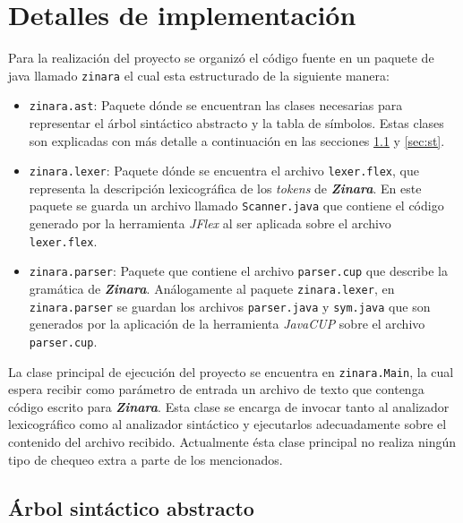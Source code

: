 \documentclass[12pt, spanish]{report}
\begin{document}
\section{Detalles de implementación}
\label{sec:codigo}

Para la realización del proyecto se organizó el código fuente en un
paquete de java llamado \texttt{zinara} el cual esta estructurado de
la siguiente manera:

\begin{itemize}
\item \texttt{zinara.ast}: Paquete dónde se encuentran las clases
  necesarias para representar el árbol sintáctico abstracto y la tabla
  de símbolos. Estas clases son explicadas con más detalle a
  continuación en las secciones \ref{sec:ast} y \ref{sec:st}.

\item \texttt{zinara.lexer}: Paquete dónde se encuentra el archivo
  \texttt{lexer.flex}, que representa la descripción lexicográfica de
  los \emph{tokens} de \emph{\textbf{Zinara}}. En este paquete se
  guarda un archivo llamado \texttt{Scanner.java} que contiene el
  código generado por la herramienta \emph{JFlex} al ser aplicada
  sobre el archivo \texttt{lexer.flex}.

\item \texttt{zinara.parser}: Paquete que contiene el archivo
  \texttt{parser.cup} que describe la gramática de
  \emph{\textbf{Zinara}}. Análogamente al paquete
  \texttt{zinara.lexer}, en \texttt{zinara.parser} se guardan los
  archivos \texttt{parser.java} y \texttt{sym.java} que son generados
  por la aplicación de la herramienta \emph{JavaCUP} sobre el archivo
  \texttt{parser.cup}.
\end{itemize}

La clase principal de ejecución del proyecto se encuentra en
\texttt{zinara.Main}, la cual espera recibir como parámetro de entrada
un archivo de texto que contenga código escrito para
\emph{\textbf{Zinara}}. Esta clase se encarga de invocar tanto al
analizador lexicográfico como al analizador sintáctico y ejecutarlos
adecuadamente sobre el contenido del archivo recibido. Actualmente
ésta clase principal no realiza ningún tipo de chequeo extra a parte
de los mencionados.

\subsection{Árbol sintáctico abstracto}
\label{sec:ast}
\end{document}
